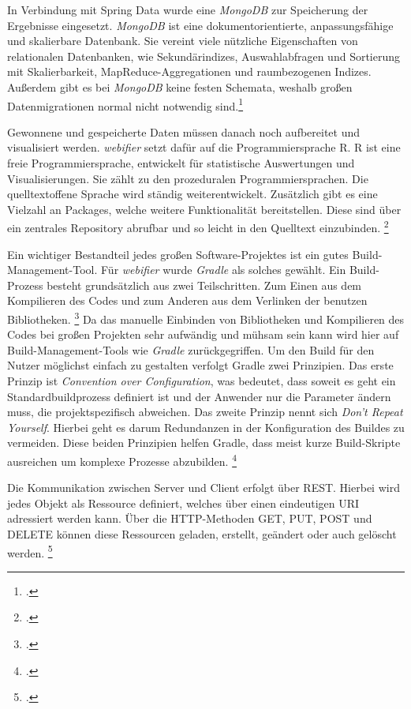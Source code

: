 In Verbindung mit Spring Data wurde eine \textit{MongoDB} zur Speicherung der Ergebnisse
eingesetzt. \textit{MongoDB} ist eine dokumentorientierte, anpassungsfähige und skalierbare
Datenbank. Sie vereint viele nützliche Eigenschaften von relationalen Datenbanken, wie
Sekundärindizes, Auswahlabfragen und Sortierung mit Skalierbarkeit, MapReduce-Aggregationen und
raumbezogenen Indizes. Außerdem gibt es bei \textit{MongoDB} keine festen Schemata, weshalb großen
Datenmigrationen normal nicht notwendig sind.\footcite[Vgl.][1f]{mongodb}

Gewonnene und gespeicherte Daten müssen danach noch aufbereitet und visualisiert werden.
\textit{webifier} setzt dafür auf die Programmiersprache R. R ist eine freie Programmiersprache,
entwickelt für statistische Auswertungen und Visualisierungen. Sie zählt zu den prozeduralen
Programmiersprachen. Die quelltextoffene Sprache wird ständig weiterentwickelt.
Zusätzlich gibt es eine Vielzahl an Packages, welche weitere Funktionalität bereitstellen. Diese
sind über ein zentrales Repository abrufbar und so leicht in den Quelltext einzubinden.
\footcite[Vgl.][1ff]{R}

Ein wichtiger Bestandteil jedes großen Software-Projektes ist ein gutes Build-Management-Tool. Für
\textit{webifier} wurde \textit{Gradle} als solches gewählt. Ein Build-Prozess besteht grundsätzlich
aus zwei Teilschritten. Zum Einen aus dem Kompilieren des Codes und zum Anderen aus dem Verlinken
der benutzen Bibliotheken. \footcite[Vgl.][]{buildprozess} Da das manuelle Einbinden von
Bibliotheken und Kompilieren des Codes bei großen Projekten sehr aufwändig und mühsam sein kann
wird hier auf Build-Management-Tools wie \textit{Gradle} zurückgegriffen. Um den Build für den
Nutzer möglichst einfach zu gestalten verfolgt Gradle zwei Prinzipien. Das erste Prinzip ist
\textit{Convention over Configuration}, was bedeutet, dass soweit es geht ein Standardbuildprozess
definiert ist und der Anwender nur die Parameter ändern muss, die projektspezifisch abweichen. Das
zweite Prinzip nennt sich \textit{Don't Repeat Yourself}. Hierbei geht es darum Redundanzen in der
Konfiguration des Buildes zu vermeiden. Diese beiden Prinzipien helfen Gradle, dass meist kurze Build-Skripte ausreichen um komplexe Prozesse abzubilden. \footcite[Vgl.][6f]{gradle}

Die Kommunikation zwischen Server und Client erfolgt über \ac{REST}. Hierbei wird jedes Objekt als
Ressource definiert, welches über einen eindeutigen \ac{URI} adressiert werden kann. Über die
HTTP-Methoden GET, PUT, POST und DELETE können diese Ressourcen geladen, erstellt, geändert
oder auch gelöscht werden. \footcite[Vgl.][]{rest}

